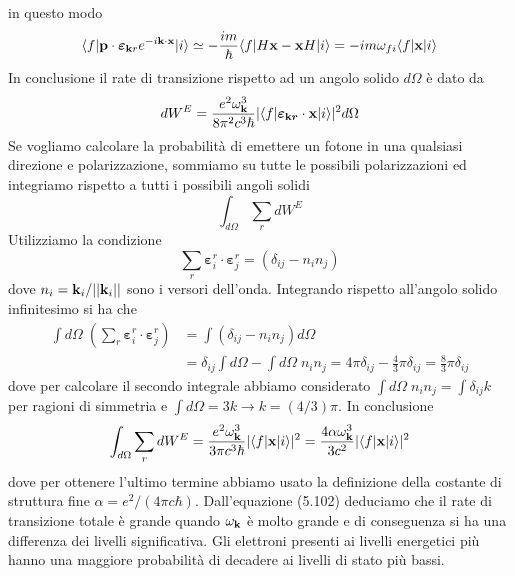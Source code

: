 in questo modo 
\begin{equation*}
	\langle f | \bold{p} \cdot \boldsymbol{\varepsilon}_{\bold{k} r}e^{-i \bold{k} \cdot \bold{x}} |i \rangle \simeq - \frac{im}{\hbar} \langle f |H\bold{x} - \bold{x}H|i \rangle = -im \omega_{fi}\langle f|\bold{x}|i \rangle 
\end{equation*}
In conclusione il rate di transizione rispetto ad un angolo solido $d \Omega$ \`e dato da 
\begin{equation}
	dW^E  = \frac{e^2 \omega_{\bold{k}}^3}{8 \pi^2 c^3 \hbar} |\langle f| \boldsymbol{\varepsilon_{\bold{k}r}} \cdot \bold{x} |i \rangle |^2 d \Omega
\end{equation}
Se vogliamo calcolare la probabilit\`a di emettere un fotone in una qualsiasi direzione e polarizzazione, sommiamo su tutte le possibili polarizzazioni ed integriamo rispetto a tutti i possibili angoli solidi
\begin{equation*}
	\int_{d \Omega} \sum_{r} dW^{E}
\end{equation*}
Utilizziamo la condizione 
\begin{equation*}
	\sum_{r} \boldsymbol{\varepsilon}_{i}^{r} \cdot \boldsymbol{\varepsilon}_{j}^{r} = (\delta_{ij}-n_in_j)
\end{equation*}
dove $n_i = \bold{k}_i/||\bold{k}_i||$ sono i versori dell'onda. Integrando rispetto all'angolo solido infinitesimo si ha che 
\begin{align*}
	\int d\Omega \; \left (\sum_{r} \boldsymbol{\varepsilon}_{i}^{r} \cdot \boldsymbol{\varepsilon}_{j}^r \right) & = \int (\delta_{ij}-n_in_j)d \Omega \\[0.4cm]
	& = \delta_{ij} \int d \Omega - \int d \Omega\;  n_i n_j = 4 \pi \delta_{ij} - \frac{4}{3}\pi \delta_{ij} = \frac{8}{3}\pi \delta_{ij}
\end{align*}
dove per calcolare il secondo integrale abbiamo considerato $\int d \Omega \; n_i n_j = \int \delta_{ij}k $ per ragioni di simmetria e $\int d\Omega = 3k \rightarrow k = (4/3) \pi$. In conclusione 
\begin{equation}
	\int_{d\Omega} \sum_{r}dW^{E} = \frac{e^2 \omega_{\bold{k}}^3}{3 \pi c^3 \hbar} |\langle f|\bold{x}|i \rangle|^2 = \frac{4 \alpha \omega_{\bold{k}}^3}{3c^2}|\langle f|\bold{x}|i \rangle|^2
\end{equation}
dove per ottenere l'ultimo termine abbiamo usato la definizione della costante di struttura fine $\alpha = e^2/(4 \pi c \hbar)$. Dall'equazione (5.102) deduciamo che il rate di transizione totale \`e grande quando $\omega_\bold{k}$ \`e molto grande e di conseguenza si ha una differenza dei livelli significativa. Gli elettroni presenti ai livelli energetici pi\`u hanno una maggiore probabilit\`a di decadere ai livelli di stato pi\`u bassi.

